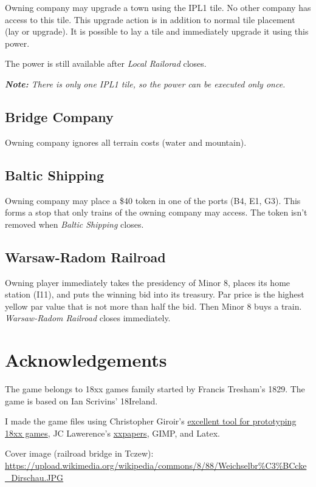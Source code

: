\documentclass[10pt,a4paper,twocolumn]{article}
\begin{document}
Owning company may upgrade a town using the IPL1 tile. No other company has access to this tile. This upgrade action is in addition to normal tile placement (lay or upgrade). It is possible to lay a tile and immediately upgrade it using this power. 

The power is still available after \textit{Local Railorad} closes.

\textit{\textbf{Note:} There is only one IPL1 tile, so the power can be executed only once.}

\subsection{Bridge Company}

Owning company ignores all terrain costs (water and mountain).

\subsection{Baltic Shipping}

Owning company may place a \$40 token in one of the ports (B4, E1, G3). This forms a stop that only trains of the owning company may access. The token isn't removed when \textit{Baltic Shipping} closes.

\subsection{Warsaw-Radom Railroad}

Owning player immediately takes the presidency of Minor 8, places its home station (I11), and puts the winning bid into its treasury. Par price is the highest yellow par value that is not more than half the bid. Then Minor 8 buys a train. \textit{Warsaw-Radom Railroad} closes immediately.

\section{Acknowledgements}

The game belongs to 18xx games family started by Francis Tresham's 1829. The game is based on Ian Scrivins' 18Ireland.

I made the game files using Christopher Giroir's \href{https://github.com/kelsin/18xx}{excellent tool for prototyping 18xx games}, JC Lawerence's \href{https://github.com/clearclaw/xxpaper}{xxpapers}, GIMP, and Latex.

Cover image (railroad bridge in Tczew): \url{https://upload.wikimedia.org/wikipedia/commons/8/88/Weichselbr\%C3\%BCcke_Dirschau.JPG}
\end{document}
